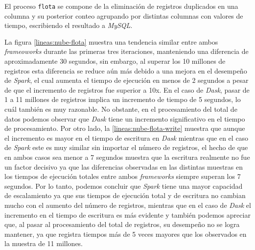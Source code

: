 El proceso \texttt{flota} se compone de la eliminación de registros duplicados en una columna y su posterior conteo agrupando por distintas columnas con valores de tiempo, escribiendo el resultado a \textit{MySQL}.

La figura \ref{lineas:nube-flota} muestra una tendencia similar entre ambos \textit{frameoworks} durante las primeras tres iteraciones, manteniendo una diferencia de aproximadamente 30 segundos, sin embargo, al superar los 10 millones de registros esta diferencia se reduce aún más debido a una mejora en el desempeño de \textit{Spark}, el cual aumenta el tiempo de ejecución en menos de 2 segundos a pesar de que el incremento de registros fue superior a 10x. En el caso de \textit{Dask}, pasar de 1 a 11 millones de registros implica un incremento de tiempo de 5 segundos, lo cuál también es muy razonable. No obstante, en el procesamiento del total de datos podemos observar que \textit{Dask} tiene un incremento significativo en el tiempo de procesamiento. Por otro lado, la \ref{lineas:nube-flota-write} muestra que aunque el incremento es mayor en el tiempo de escritura en \textit{Dask} mientras que en el caso de \textit{Spark} este es muy similar sin importar el número de registros, el hecho de que en ambos casos sea menor a 7 segundos muestra que la escritura realmente no fue un factor decisivo ya que las diferencias observadas en las distintas muestras en los tiempos de ejecución totales entre ambos \textit{frameworks} siempre superan los 7 segundos. Por lo tanto, podemos concluir que \textit{Spark} tiene una mayor capacidad de escalamiento ya que sus tiempos de ejecución total y de escritura no cambian mucho con el aumento del número de registros, mientras que en el caso de \textit{Dask} el incremento en el tiempo de escritura es más evidente y también podemos apreciar que, al pasar al procesamiento del total de registros, su desempeño no se logra mantener, ya que registra tiempos más de 5 veces mayores que los observados en la muestra de 11 millones. 



